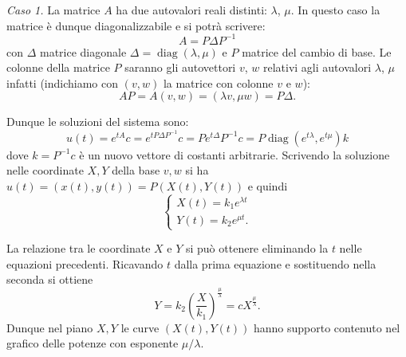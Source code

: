 \documentclass[italian,a4paper]{scrartcl}
\DeclareMathOperator{\diag}{diag}
\begin{document}
\emph{Caso 1.}
La matrice $A$ ha due autovalori reali distinti: $\lambda$, $\mu$.
In questo caso la matrice è dunque diagonalizzabile e si potrà scrivere:
\[
  A = P \Delta P^{-1}
\]
con $\Delta$ matrice diagonale $\Delta = \diag(\lambda,\mu)$
 e $P$ matrice del cambio di base. Le colonne
della matrice $P$ saranno gli autovettori $v$, $w$ relativi agli
autovalori $\lambda$, $\mu$ infatti (indichiamo con $(v,w)$ la matrice con colonne $v$ e $w$):
\[
  A P = A (v, w) = (\lambda v, \mu w) = P \Delta.
\]

Dunque le soluzioni del sistema sono:
\[
  u(t) = e^{tA}c = e^{tP\Delta P^{-1}}c = P e^{t\Delta} P^{-1}c
  = P \diag(e^{t \lambda},e^{t \mu}) k
\]
dove $k=P^{-1}c$ è un nuovo vettore di costanti
arbitrarie. Scrivendo la soluzione nelle coordinate $X,Y$ della base $v,w$ si ha $u(t) = (x(t),y(t)) = P(X(t),Y(t))$
e quindi
\[
\begin{cases}
X(t) = k_1 e^{\lambda t} \\
Y(t) = k_2 e^{\mu t}.
\end{cases}
\]

La relazione tra le coordinate $X$ e $Y$ si può ottenere eliminando la
$t$ nelle equazioni precedenti. Ricavando $t$ dalla prima equazione e
sostituendo nella seconda si ottiene
\[
Y = k_2 \left(\frac{X}{k_1}\right)^{\frac{\mu}{\lambda}}
  = c X^{\frac \mu \lambda}.
\]
Dunque nel piano $X,Y$ le curve $(X(t),Y(t))$ hanno supporto contenuto
nel grafico delle potenze con esponente $\mu/\lambda$.
\end{document}
